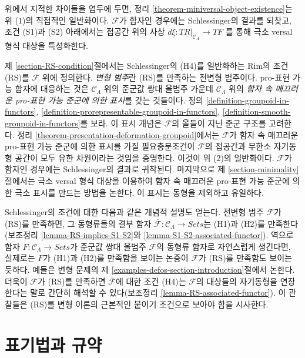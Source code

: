 \medskip\noindent
위에서 지적한 차이들을 염두에 두면,
정리 \ref{theorem-miniversal-object-existence}는 위 (1)의 직접적인
일반화이다. $\mathcal{F}$가 함자인 경우에는 Schlessinger의 결과를 되찾고,
조건 (S1)과 (S2) 아래에서는 접공간 위의 사상
$d\underline{\xi} : T\underline{R}|_{\mathcal{C}_\Lambda} \to TF$
를 통해 극소 versal 형식 대상을 특성화한다.

\medskip\noindent
제 \ref{section-RS-condition}절에서는 Schlessinger의 (H4)를 일반화하는
Rim의 조건 (RS)를 $\mathcal{F}$ 위에 정의한다. {\it 변형 범주}란
(RS)를 만족하는 전변형 범주이다.
pro-표현 가능 함자에 대응하는 것은 $\mathcal{C}_\Lambda$ 위의 준군값 쌍대
올범주 가운데 $\mathcal{C}_\Lambda$ 위의
{\it 함자 속 매끄러운 pro-표현 가능 준군에 의한 표시}를 갖는 것들이다.
정의 \ref{definition-groupoid-in-functors},
\ref{definition-prorepresentable-groupoid-in-functors},
\ref{definition-smooth-groupoid-in-functors}를 보라.
이 표시 개념은 $\mathcal{F}$의 올들이 지닌 준군 구조를 고려한다.
정리 \ref{theorem-presentation-deformation-groupoid}에서는
$\mathcal{F}$가 함자 속 매끄러운 pro-표현 가능 준군에 의한 표시를 가질
필요충분조건이 $\mathcal{F}$의 접공간과 무한소 자기동형 공간이 모두 유한
차원이라는 것임을 증명한다. 이것이 위 (2)의 일반화이다. $\mathcal{F}$가
함자인 경우에는 Schlessinger의 결과로 귀착된다. 마지막으로 제
\ref{section-minimality}절에서는 극소 versal 형식 대상을 이용하여 함자 속
매끄러운 pro-표현 가능 준군에 의한 극소 표시를 만드는 방법을 논한다. 이 표시는
동형을 제외하고 유일하다.

\medskip\noindent
Schlessinger의 조건에 대한 다음과 같은 개념적 설명도 얻는다.
전변형 범주 $\mathcal{F}$가 (RS)를 만족하면, 그 동형류들의 결부 함자
$\overline{\mathcal{F}}: \mathcal{C}_\Lambda \to \textit{Sets}$는
(H1)과 (H2)를 만족한다
(보조정리 \ref{lemma-RS-implies-S1-S2}와
\ref{lemma-S1-S2-associated-functor}).
역으로 함자 $F : \mathcal{C}_\Lambda \to \textit{Sets}$가 준군값 쌍대
올범주 $\mathcal{F}$의 동형류 함자로 자연스럽게 생긴다면, 실제로는 $F$가
(H1)과 (H2)를 만족함을 보이는 논증이 $\mathcal{F}$가 (RS)를 만족함도 보이는
듯하다. 예들은 변형 문제의 제
\ref{examples-defos-section-introduction}절에서 논한다.
더욱이 $\mathcal{F}$가 (RS)를 만족하면 $\overline{\mathcal{F}}$에 대한 조건
(H4)는 $\mathcal{F}$의 대상들의 자기동형을 연장한다는 말로 간단히 해석할 수
있다(보조정리 \ref{lemma-RS-associated-functor}).
이 관찰들은 (RS)를 변형 이론의 근본적인 붙이기 조건으로 보아야 함을 시사한다.




\section{표기법과 규약}
\label{section-notations-conventions}

